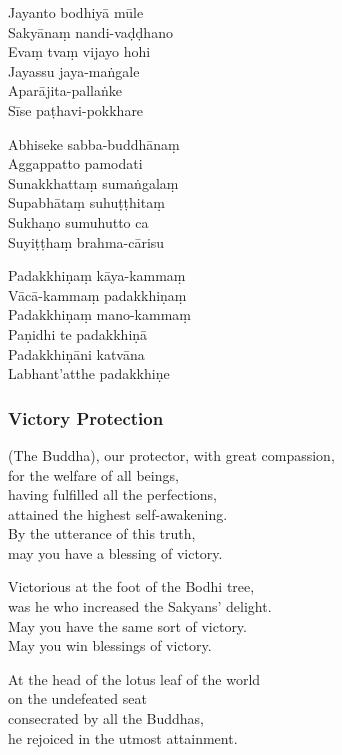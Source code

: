 \begin{paritta}
  Jayanto bodhiyā mūle\\
  Sakyānaṃ nandi-vaḍḍhano\\
  Evaṃ tvaṃ vijayo hohi\\
  Jayassu jaya-maṅgale\\
  Aparājita-pallaṅke\\
  Sīse paṭhavi-pokkhare

  Abhiseke sabba-buddhānaṃ\\
  Aggappatto pamodati\\
  Sunakkhattaṃ sumaṅgalaṃ\\
  Supabhātaṃ suhuṭṭhitaṃ\\
  Sukhaṇo sumuhutto ca\\
  Suyiṭṭhaṃ brahma-cārisu

  Padakkhiṇaṃ kāya-kammaṃ\\
  Vācā-kammaṃ padakkhiṇaṃ\\
  Padakkhiṇaṃ mano-kammaṃ\\
  Paṇidhi te padakkhiṇā\\
  Padakkhiṇāni katvāna\\
  Labhant'atthe padakkhiṇe 
\end{paritta}

\subsubsection{Victory Protection}


(The Buddha), our protector, with great compassion,\\
for the welfare of all beings,\\
having fulfilled all the perfections,\\
attained the highest self-awakening.\\
By the utterance of this truth,\\
may you have a blessing of victory.

Victorious at the foot of the Bodhi tree,\\
was he who increased the Sakyans' delight.\\
May you have the same sort of victory.\\
May you win blessings of victory.

At the head of the lotus leaf of the world\\
on the undefeated seat\\
consecrated by all the Buddhas,\\
he rejoiced in the utmost attainment.

